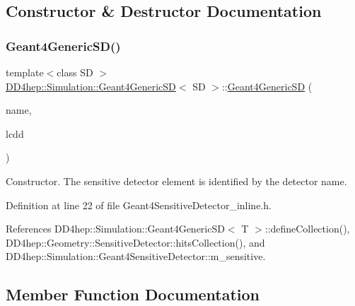 \subsection{Constructor \& Destructor Documentation}
\hypertarget{class_d_d4hep_1_1_simulation_1_1_geant4_generic_s_d_a7ce3d1272f106b20f2f92e50fa2e1996}{}\label{class_d_d4hep_1_1_simulation_1_1_geant4_generic_s_d_a7ce3d1272f106b20f2f92e50fa2e1996} 
\subsubsection{\texorpdfstring{Geant4\+Generic\+S\+D()}{Geant4GenericSD()}}
{\footnotesize\ttfamily template$<$class SD $>$ \\
\hyperlink{class_d_d4hep_1_1_simulation_1_1_geant4_generic_s_d}{D\+D4hep\+::\+Simulation\+::\+Geant4\+Generic\+SD}$<$ SD $>$\+::\hyperlink{class_d_d4hep_1_1_simulation_1_1_geant4_generic_s_d}{Geant4\+Generic\+SD} (\begin{DoxyParamCaption}\item[{const std\+::string \&}]{name,  }\item[{\hyperlink{class_d_d4hep_1_1_geometry_1_1_l_c_d_d}{L\+C\+DD} \&}]{lcdd }\end{DoxyParamCaption})}



Constructor. The sensitive detector element is identified by the detector name. 



Definition at line 22 of file Geant4\+Sensitive\+Detector\+\_\+inline.\+h.



References D\+D4hep\+::\+Simulation\+::\+Geant4\+Generic\+S\+D$<$ T $>$\+::define\+Collection(), D\+D4hep\+::\+Geometry\+::\+Sensitive\+Detector\+::hits\+Collection(), and D\+D4hep\+::\+Simulation\+::\+Geant4\+Sensitive\+Detector\+::m\+\_\+sensitive.



\subsection{Member Function Documentation}
\hypertarget{class_d_d4hep_1_1_simulation_1_1_geant4_generic_s_d_a72d6c9cb683b9a0bd58fdbd17dc94be6}{}\label{class_d_d4hep_1_1_simulation_1_1_geant4_generic_s_d_a72d6c9cb683b9a0bd58fdbd17dc94be6} 
